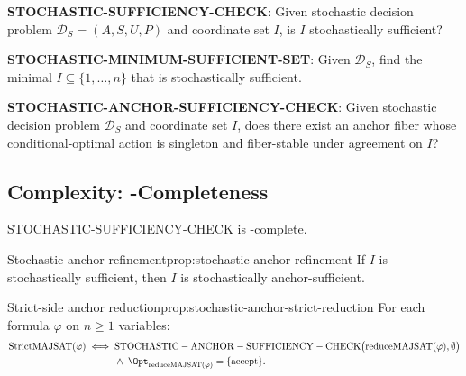 \begin{decision}\label{dec:stochastic-sufficiency-check}
\textbf{STOCHASTIC-SUFFICIENCY-CHECK}: Given stochastic decision problem $\mathcal{D}_S = (A, S, U, P)$ and coordinate set $I$, is $I$ stochastically sufficient?
\end{decision}

\begin{decision}\label{dec:stochastic-minsuff}
\textbf{STOCHASTIC-MINIMUM-SUFFICIENT-SET}: Given $\mathcal{D}_S$, find the minimal $I \subseteq \{1, \ldots, n\}$ that is stochastically sufficient.
\end{decision}

\begin{decision}\label{dec:stochastic-anchor-sufficiency-check}
\textbf{STOCHASTIC-ANCHOR-SUFFICIENCY-CHECK}: Given stochastic decision problem $\mathcal{D}_S$ and coordinate set $I$, does there exist an anchor fiber whose conditional-optimal action is singleton and fiber-stable under agreement on $I$?
\end{decision}


\subsection{Complexity: \PP-Completeness}

\begin{theorem}\label{th:stochastic-sufficiency-pp}
STOCHASTIC-SUFFICIENCY-CHECK is \PP-complete.
\end{theorem}

\begin{claim}{Stochastic anchor refinement}{prop:stochastic-anchor-refinement}
If $I$ is stochastically sufficient, then $I$ is stochastically anchor-sufficient.
\end{claim}


\begin{claim}{Strict-side anchor reduction}{prop:stochastic-anchor-strict-reduction}
For each formula $\varphi$ on $n \ge 1$ variables:
\[
\begin{aligned}
\mathrm{StrictMAJSAT}(\varphi)
\iff {} &
\mathrm{STOCHASTIC\allowbreak-\allowbreak ANCHOR\allowbreak-\allowbreak SUFFICIENCY\allowbreak-\allowbreak CHECK}
\bigl(\mathrm{reduceMAJSAT}(\varphi),\emptyset\bigr) \\
& {}\land\;
\Opt_{\mathrm{reduceMAJSAT}(\varphi)}=\{\mathrm{accept}\}.
\end{aligned}
\]
\end{claim}

